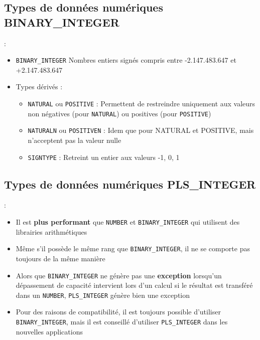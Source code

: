 \documentclass[10pt]{beamer}
\begin{document}
\subsection{Types de données numériques BINARY\_INTEGER}
\begin{frame}{\secname : \subsecname}
    \begin{itemize}
        \item \lstinline[language=xml]!BINARY_INTEGER! Nombres entiers signés compris entre -2.147.483.647 et +2.147.483.647
        \item Types dérivés :
              \begin{itemize}
                  \item \lstinline[language=xml]!NATURAL! ou \lstinline[language=xml]!POSITIVE! : Permettent de restreindre uniquement aux valeurs non négatives (pour \lstinline[language=xml]!NATURAL!) ou positives (pour \lstinline[language=xml]!POSITIVE!)
                  \item \lstinline[language=xml]!NATURALN! ou \lstinline[language=xml]!POSITIVEN! : Idem que pour NATURAL et POSITIVE, mais n'acceptent pas la valeur nulle
                  \item \lstinline[language=xml]!SIGNTYPE! : Retreint un entier aux valeurs -1, 0, 1
              \end{itemize}
    \end{itemize}
\end{frame}

\subsection{Types de données numériques PLS\_INTEGER}
\begin{frame}{\secname : \subsecname}
    \begin{itemize}
        \item Il est \textbf{plus performant} que \lstinline[language=xml]!NUMBER! et \lstinline[language=xml]!BINARY_INTEGER! qui utilisent des librairies arithmétiques
        \item Même s'il possède le même rang que \lstinline[language=xml]!BINARY_INTEGER!, il ne se comporte pas toujours de la même manière
        \item Alors que \lstinline[language=xml]!BINARY_INTEGER! ne génère pas une \textbf{exception} lorsqu'un dépassement de capacité intervient lors d'un calcul si le résultat est transféré dans un \lstinline[language=xml]!NUMBER!, \lstinline[language=xml]!PLS_INTEGER! génère bien une exception
        \item Pour des raisons de compatibilité, il est toujours possible d'utiliser \lstinline[language=xml]!BINARY_INTEGER!, mais il est conseillé d'utiliser \lstinline[language=xml]!PLS_INTEGER! dans les nouvelles applications

    \end{itemize}
\end{frame}
\end{document}
